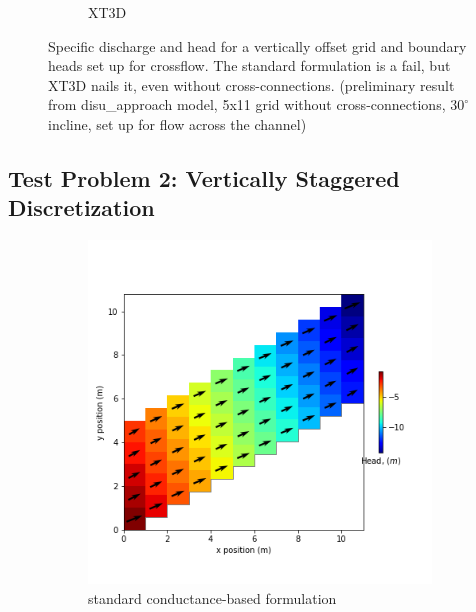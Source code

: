 \documentclass{article}
\begin{document}
\begin{figure}[H]
\begin{subfigure}{0.4\textwidth}
	\caption{XT3D}
	\label{fig:disu-x-nocc-cf-head}
\end{subfigure}
\caption{Specific discharge and head for a vertically offset grid and boundary heads set up for crossflow. The standard formulation is a fail, but XT3D nails it, even without cross-connections. (preliminary result from disu\_approach model, 5x11 grid without cross-connections, $30^{\circ}$ incline, set up for flow across the channel)}
\label{fig:figures}
\end{figure}

\subsection{Test Problem 2: Vertically Staggered Discretization}

\begin{figure}[H]
\centering
\begin{subfigure}{0.4\textwidth}
	\includegraphics[width=\textwidth]{../figures/disu-af-vs-s-head.png}
	\caption{standard conductance-based formulation}
	\label{fig:disu-s-cc-head}
\end{subfigure}
\hfill
\begin{subfigure}{0.4\textwidth}

\end{subfigure}
\end{figure}
\end{document}
